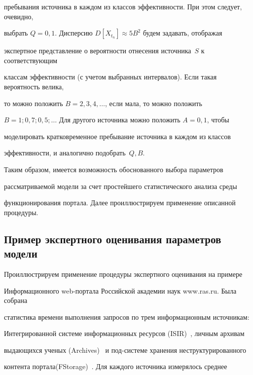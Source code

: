 пребывания источника в каждом из классов эффективности. При этом следует, очевидно, 


выбрать $Q=0{,}1$. Дисперсию $D[X_{t_n}]\approx 5B^2$ будем задавать, отображая 


экспертное представление о вероятности отнесения источника~$S$ к соответствующим 


классам эффективности (с учетом выбранных интервалов). Если такая вероятность велика, 


то можно положить $B=2, 3, 4, \ldots$, если мала, то можно положить 


$B=1;0{,}7;0{,}5;\ldots$ Для другого источника можно положить $A=0{,}1$, чтобы 


моделировать кратковременное пребывание источника в каждом из классов 


эффективности, и аналогично подобрать~$Q, B$.


      


      Таким образом, имеется возможность обоснованного выбора параметров 


рассматриваемой модели за счет простейшего статистического анализа среды 


функционирования портала. Далее проиллюстрируем применение описанной процедуры.


      


\subsection{Пример экспертного оценивания параметров модели} %


      


      Проиллюстрируем применение процедуры экспертного оценивания на примере 


Информационного web-портала Российской академии наук {\sf www.ras.ru}. Была собрана 


статистика времени выполнения запросов по трем информационным источникам:\linebreak 


Интегрированной системе информационных ресурсов (ISIR)~\cite{9-8}, личным архивам 


выдающихся ученых (Archives)~\cite{10-8} и под-\linebreak сис\-те\-ме хранения неструктурированного 


контента портала\linebreak (FStorage)~\cite{11-8}. Для каждого источника измерялось среднее 


